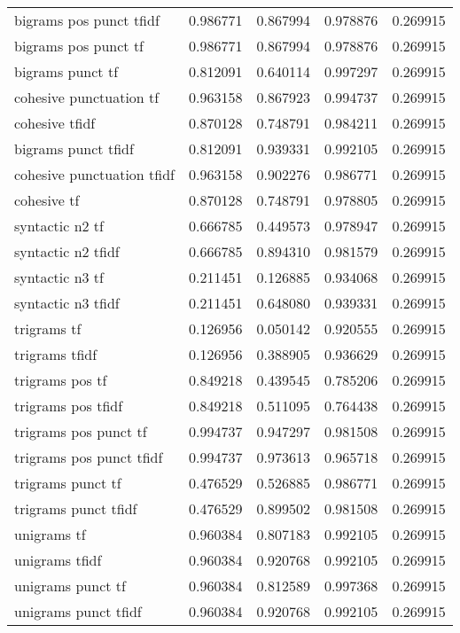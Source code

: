\begin{tabular}{lrrrr}
bigrams pos punct tfidf    &  0.986771 &     0.867994 &       0.978876 &             0.269915 \\
bigrams pos punct tf       &  0.986771 &     0.867994 &       0.978876 &             0.269915 \\
bigrams punct tf           &  0.812091 &     0.640114 &       0.997297 &             0.269915 \\
cohesive punctuation tf    &  0.963158 &     0.867923 &       0.994737 &             0.269915 \\
cohesive tfidf             &  0.870128 &     0.748791 &       0.984211 &             0.269915 \\
bigrams punct tfidf        &  0.812091 &     0.939331 &       0.992105 &             0.269915 \\
cohesive punctuation tfidf &  0.963158 &     0.902276 &       0.986771 &             0.269915 \\
cohesive tf                &  0.870128 &     0.748791 &       0.978805 &             0.269915 \\
syntactic n2 tf            &  0.666785 &     0.449573 &       0.978947 &             0.269915 \\
syntactic n2 tfidf         &  0.666785 &     0.894310 &       0.981579 &             0.269915 \\
syntactic n3 tf            &  0.211451 &     0.126885 &       0.934068 &             0.269915 \\
syntactic n3 tfidf         &  0.211451 &     0.648080 &       0.939331 &             0.269915 \\
trigrams tf                &  0.126956 &     0.050142 &       0.920555 &             0.269915 \\
trigrams tfidf             &  0.126956 &     0.388905 &       0.936629 &             0.269915 \\
trigrams pos tf            &  0.849218 &     0.439545 &       0.785206 &             0.269915 \\
trigrams pos tfidf         &  0.849218 &     0.511095 &       0.764438 &             0.269915 \\
trigrams pos punct tf      &  0.994737 &     0.947297 &       0.981508 &             0.269915 \\
trigrams pos punct tfidf   &  0.994737 &     0.973613 &       0.965718 &             0.269915 \\
trigrams punct tf          &  0.476529 &     0.526885 &       0.986771 &             0.269915 \\
trigrams punct tfidf       &  0.476529 &     0.899502 &       0.981508 &             0.269915 \\
unigrams tf                &  0.960384 &     0.807183 &       0.992105 &             0.269915 \\
unigrams tfidf             &  0.960384 &     0.920768 &       0.992105 &             0.269915 \\
unigrams punct tf          &  0.960384 &     0.812589 &       0.997368 &             0.269915 \\
unigrams punct tfidf       &  0.960384 &     0.920768 &       0.992105 &             0.269915 \\
\bottomrule
\end{tabular}

